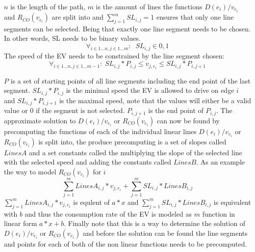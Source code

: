 $n$ is the length of the path, $m$ is the amount of lines the functions \( D(e_i)/v_{e_i} \) and $R_{CO}(v_{e_i})$ are split into and $\sum_{j=1}^{m} SL_{i,j} = 1$ ensures that only one line segments can be selected.
Being that exactly one line segment needs to be chosen. In other words, SL needs to be binary values.
\begin{equation*}
\forall_{i\in1 \dots n, j \in 1 \dots m}: \; \; SL_{i,j} \in{0,1} 
\end{equation*}
The speed of the EV needs to be constrained by the line segment chosen:
\begin{equation*}
\forall_{i\in1 \dots n, j \in 1 \dots m-1}:\; SL_{i,j} * P_{i,j}  \le  v_{j,e_i} \le SL_{i,j}*P_{i,j+1}
\end{equation*}

$P$ is a set of starting points of all line segments including the end point of the last segment. $SL_{i,j} * P_{i,j}$ is the minimal speed the EV is allowed to drive on edge $i$ and $SL_{i,j}*P_{i,j+1}$ is the maximal speed, note that the values will either be a valid value or $0$ if the segment is not selected. $P_{i,j+1}$ is the end point of $P_{i,j}$. 
The approximate solution to \( D(e_i)/v_{e_i} \) or $R_{CO}(v_{e_i})$ can now be found by precomputing the functions of each of the individual linear lines \( D(e_i)/v_{e_i} \) or $R_{CO}(v_{e_i})$ is split into, the produce precomputing is a set of slopes called $LinesA$ and a set constants called  the  multiplying the slope of the selected line with the selected speed and adding the constants called $LinesB$. As an example the way to model $R_{CO}(v_{e_i})$ for $i$
\begin{equation*}
\sum_{j=1}^{m} LinesA_{i,j}*v_{j,e_i} + \sum_{j=1}^{m} SL_{i,j}*LinesB_{i,j} 
\end{equation*}
$\sum_{j=1}^{m} LinesA_{i,j}*v_{j,e_i}$ is equlent of $a*x$ and $\sum_{j=1}^{m} SL_{i,j}*LinesB_{i,j}$ is equivalent with $b$ and thus the consumption rate of the EV is modeled as $m$ function in linear form $a*x + b$. 
Finally note that this is a way to determine the solution of \( D(e_i)/v_{e_i} \) or $R_{CO}(v_{e_i})$ and before the solution can be found the line segments and points for each of both of the non linear functions needs to be precomputed. 


